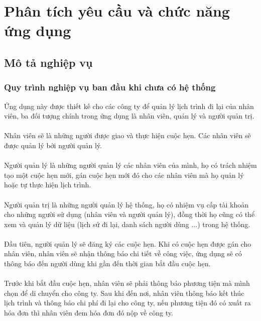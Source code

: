 \documentclass[a4paper]{article}
\begin{document}
\section{Phân tích yêu cầu và chức năng ứng dụng}
\subsection{Mô tả nghiệp vụ}
\subsubsection{Quy trình nghiệp vụ ban đầu khi chưa có hệ thống}
Ứng dụng này được thiết kế cho các công ty để quản lý lịch trình đi lại của nhân viên, ba đối tượng chính trong ứng dụng là nhân viên, quản lý và người quản trị.\\
\\
Nhân viên sẽ là những người được giao và thực hiện cuộc hẹn. Các nhân viên sẽ được quản lý bởi người quản lý.\\
\\
Người quản lý là những người quản lý các nhân viên của mình, họ có trách nhiệm tạo một cuộc hẹn mới, gán cuộc hẹn mới đó cho các nhân viên mà họ quản lý hoặc tự thực hiện lịch trình.\\
\\
Người quản trị là những người quản lý hệ thống, họ có nhiệm vụ cấp tài khoản cho những người sử dụng (nhân viên và người quản lý), đồng thời họ cũng có thể xem và quản lý dữ liệu (lịch sử đi lại, danh sách người dùng ...) trong hệ thống.\\
\\
Đầu tiên, người quản lý sẽ đăng ký các cuộc hẹn. Khi có cuộc hẹn được gán cho nhân viên, nhân viên sẽ nhận thông báo chi tiết về công việc, ứng dụng sẽ có thông báo đến người dùng khi gần đến thời gian bắt đầu cuộc hẹn.\\
\\
Trước khi bắt đầu cuộc hẹn, nhân viên sẽ phải thông báo phương tiện mà mình chọn để di chuyển cho công ty.
Sau khi đến nơi, nhân viên thông báo kết thúc lịch trình và thông báo chi phí đi lại cho công ty, nếu phương tiện đó có xuất ra hóa đơn thì nhân viên đem hóa đơn đó nộp về công ty.
\end{document}
